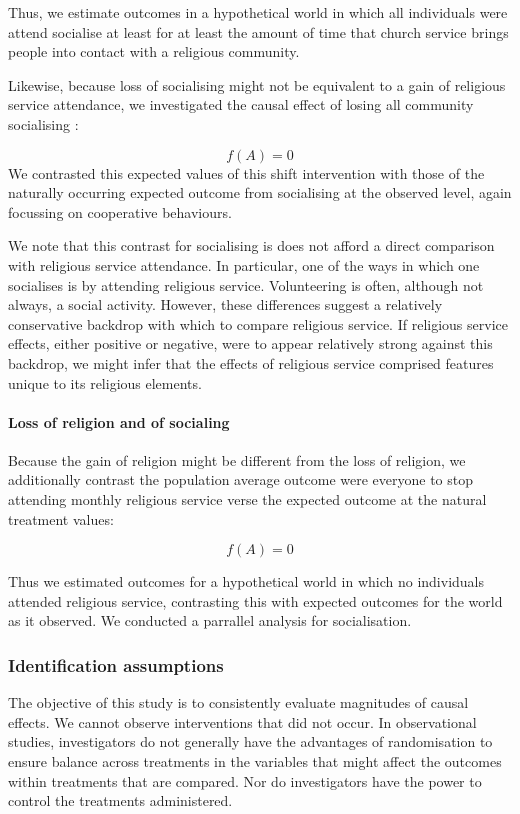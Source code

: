 \documentclass[
  singlecolumn]{article}
\let\oldparagraph\paragraph
\renewcommand{\paragraph}[1]{\oldparagraph{#1}\mbox{}}
\begin{document}
Thus, we estimate outcomes in a hypothetical world in which all
individuals were attend socialise at least for at least the amount of
time that church service brings people into contact with a religious
community.

Likewise, because loss of socialising might not be equivalent to a gain
of religious service attendance, we investigated the causal effect of
losing all community socialising :

\[f(A) = 0 \] We contrasted this expected values of this shift
intervention with those of the naturally occurring expected outcome from
socialising at the observed level, again focussing on cooperative
behaviours.

We note that this contrast for socialising is does not afford a direct
comparison with religious service attendance. In particular, one of the
ways in which one socialises is by attending religious service.
Volunteering is often, although not always, a social activity. However,
these differences suggest a relatively conservative backdrop with which
to compare religious service. If religious service effects, either
positive or negative, were to appear relatively strong against this
backdrop, we might infer that the effects of religious service comprised
features unique to its religious elements.

\paragraph{Loss of religion and of
socialing}\label{loss-of-religion-and-of-socialing}

Because the gain of religion might be different from the loss of
religion, we additionally contrast the population average outcome were
everyone to stop attending monthly religious service verse the expected
outcome at the natural treatment values:

\[f(A) = 0 \]

Thus we estimated outcomes for a hypothetical world in which no
individuals attended religious service, contrasting this with expected
outcomes for the world as it observed. We conducted a parrallel analysis
for socialisation.

\subsubsection{Identification
assumptions}\label{identification-assumptions}

The objective of this study is to consistently evaluate magnitudes of
causal effects. We cannot observe interventions that did not occur. In
observational studies, investigators do not generally have the
advantages of randomisation to ensure balance across treatments in the
variables that might affect the outcomes within treatments that are
compared. Nor do investigators have the power to control the treatments
administered.
\end{document}
